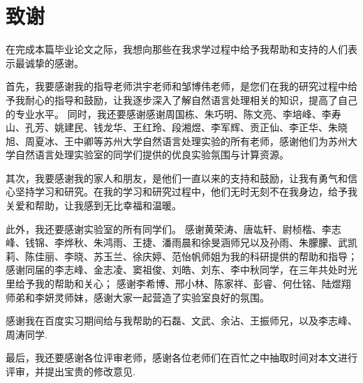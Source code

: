 \chapter{致谢}

在完成本篇毕业论文之际，我想向那些在我求学过程中给予我帮助和支持的人们表示最诚挚的感谢。

首先，我要感谢我的指导老师洪宇老师和邹博伟老师，是您们在我的研究过程中给予我耐心的指导和鼓励，让我逐步深入了解自然语言处理相关的知识，提高了自己的专业水平。
同时，我还要感谢感谢周国栋、朱巧明、陈文亮、李培峰、李寿山、孔芳、姚建民、钱龙华、王红玲、段湘煜、李军辉、贡正仙、李正华、朱晓旭、周夏冰、王中卿等苏州大学自然语言处理实验的所有老师，感谢他们为苏州大学自然语言处理实验室的同学们提供的优良实验氛围与计算资源。

其次，我要感谢我的家人和朋友，是他们一直以来的支持和鼓励，让我有勇气和信心坚持学习和研究。在我的学习和研究过程中，他们无时无刻不在我身边，给予我关爱和帮助，让我感到无比幸福和温暖。

此外，我还要感谢实验室的所有同学们。
感谢黄荣涛、唐竑轩、尉桢楷、李志峰、钱锦、李烨秋、朱鸿雨、王捷、潘雨晨和徐旻涵师兄以及孙雨、朱朦朦、武凯莉、陈佳丽、李晓、苏玉兰、徐庆婷、范怡帆师姐为我的科研提供的帮助和指导；
感谢同届的李志峰、金志凌、窦祖俊、刘皓、刘东、李中秋同学，在三年共处时光里给予我的帮助和关心；
感谢李希博、邢小林、陈家祥、彭睿、何仕铭、陆煜翔师弟和李妍灵师妹，感谢大家一起营造了实验室良好的氛围。

感谢我在百度实习期间给与我帮助的石磊、文武、余沾、王振师兄，以及李志峰、周涛同学.

最后，我还要感谢各位评审老师，感谢各位老师们在百忙之中抽取时间对本文进行评审，并提出宝贵的修改意见.

